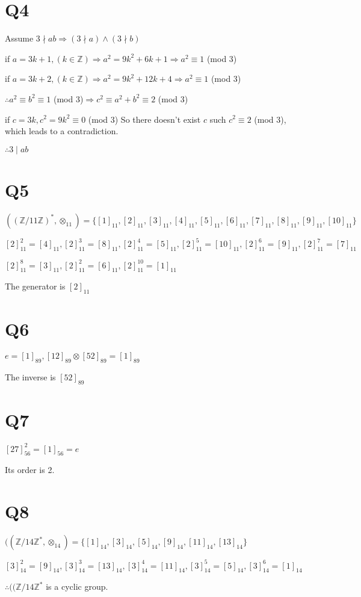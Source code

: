 \documentclass[12pt]{article}
\begin{document}
\section{Q4}
Assume $3\nmid ab\Rightarrow (3\nmid a)\wedge(3\nmid b)$
\par if $a=3k+1,(k\in\mathbb{Z})\Rightarrow a^2=9k^2+6k+1\Rightarrow a^2\equiv1$ (mod 3)
\par if $a=3k+2,(k\in\mathbb{Z})\Rightarrow a^2=9k^2+12k+4\Rightarrow a^2\equiv1$ (mod 3)
\par$\therefore a^2\equiv b^2\equiv1$ (mod 3)$\Rightarrow c^2\equiv a^2+b^2\equiv 2$ (mod 3)
\par if $c=3k,c^2=9k^2\equiv0$ (mod 3) 
So there doesn't exist $c$ such $c^2\equiv2$ (mod 3), which leads to a contradiction.
\par$\therefore3\mid ab$
\section{Q5}
$((\mathbb{Z}/11\mathbb{Z})^*,\otimes_{11})=\{[1]_{11},[2]_{11},[3]_{11},[4]_{11},[5]_{11},[6]_{11},[7]_{11},[8]_{11},[9]_{11},[10]_{11}\}$
\par $[2]_{11}^2=[4]_{11},[2]_{11}^3=[8]_{11},[2]_{11}^4=[5]_{11},[2]_{11}^5=[10]_{11},[2]_{11}^6=[9]_{11},[2]_{11}^7=[7]_{11}$
\par$[2]_{11}^8=[3]_{11},[2]_{11}^2=[6]_{11},[2]_{11}^10=[1]_{11}$
\par The generator is $[2]_{11}$
\section{Q6}
$e=[1]_{89},[12]_{89}\otimes[52]_{89}=[1]_{89}$
\par The inverse is $[52]_{89}$
\section{Q7}
$[27]_{56}^2=[1]_{56}=e$
\par Its order is 2.
\section{Q8}
$((\mathbb{Z}/14\mathbb{Z}^*,\otimes_{14})=\{[1]_{14},[3]_{14},[5]_{14},[9]_{14},[11]_{14},[13]_{14}\}$
\par $[3]_{14}^2=[9]_{14},[3]_{14}^3=[13]_{14},[3]_{14}^4=[11]_{14},[3]_{14}^5=[5]_{14},[3]_{14}^6=[1]_{14}$
\par $\therefore((\mathbb{Z}/14\mathbb{Z}^*$ is a cyclic group.
\end{document}

